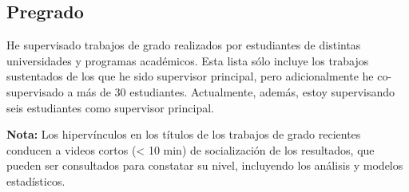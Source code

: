 \documentclass[11pt,a4paper,]{awesome-cv}
\begin{document}
\hypertarget{section-1}{%
\subsection{\texorpdfstring{\textbf{Pregrado}}{}}\label{section-1}}

\begin{footnotesize}
He supervisado trabajos de grado realizados por estudiantes de distintas universidades y programas académicos. Esta lista sólo incluye los trabajos sustentados de los que he sido supervisor principal, pero adicionalmente he co-supervisado a más de 30 estudiantes. Actualmente, además, estoy supervisando seis estudiantes como supervisor principal.

\textbf{Nota:} Los hipervínculos en los títulos de los trabajos de grado recientes conducen a videos cortos (< 10 min) de socialización de los resultados, que pueden ser consultados para constatar su nivel, incluyendo los análisis y modelos estadísticos.
\end{footnotesize}
\end{document}
